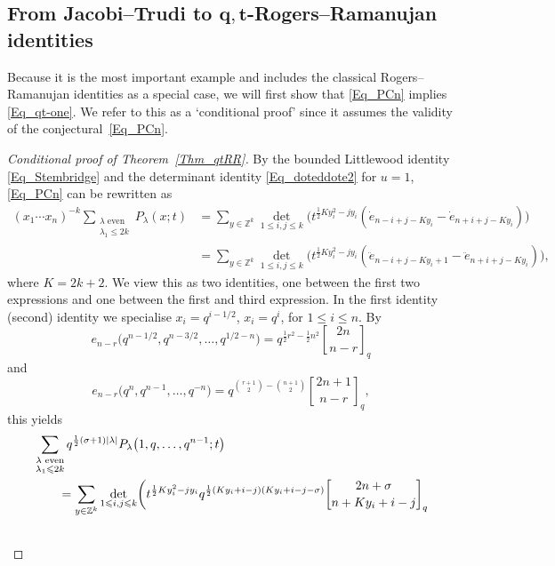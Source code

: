 \documentclass[pdftex]{sigma}
\numberwithin{equation}{section}
\renewcommand{\leq}{\leqslant}
\newcommand{\qbin}[2]{\genfrac{[}{]}{0pt}{}{#1}{#2}}
\newcommand{\abs}[1]{\vert#1\vert}
\newcommand{\la}{\lambda}
\begin{document}

\subsection[From Jacobi--Trudi to q,t-Rogers--Ramanujan identities]{From Jacobi--Trudi to $\boldsymbol{q,t}$-Rogers--Ramanujan identities}

Because it is the most important example and includes the classical
Rogers--Ramanujan identities as a special case, we will first show that
\eqref{Eq_PCn} implies \eqref{Eq_qt-one}.
We refer to this as a `conditional proof' since it assumes the validity
of the conjectural~\eqref{Eq_PCn}.

\begin{proof}[{Conditional proof of Theorem~\ref{Thm_qtRR}}]
By the bounded Littlewood identity \eqref{Eq_Stembridge} and the
determinant identity \eqref{Eq_doteddote2} for $u=1$, \eqref{Eq_PCn}
can be rewritten as
\begin{align*}
(x_1\cdots x_n)^{-k}
\sum_{\substack{\la\text{ even} \\[1pt] \la_1\leq 2k}}
P_{\la}(x;t)&=\sum_{y\in\mathbb{Z}^k}
\det_{1\leq i,j\leq k}\bigl(t^{\frac{1}{2}Ky_i^2-j y_i}
 (\dot{e}_{n-i+j-Ky_i}-\dot{e}_{n+i+j-Ky_i} )\bigr) \\
&=\sum_{y\in\mathbb{Z}^k}
\det_{1\leq i,j\leq k}\bigl(t^{\frac{1}{2}Ky_i^2-j y_i}
 (\ddot{e}_{n-i+j-Ky_i+1}-\ddot{e}_{n+i+j-Ky_i} )\bigr),
\end{align*}
where $K=2k+2$.
We view this as two identities, one between the first two
expressions and one between the first and third expression.
In the first identity (second) identity we specialise
$x_i=q^{i-1/2}$, $x_i=q^i$, for $1\leq i\leq n$.
By \cite[p.~27]{Macdonald95}
\[
e_{n-r}\bigl(q^{n-1/2},q^{n-3/2},\dots,q^{1/2-n}\bigr)
=q^{\frac{1}{2}r^2-\frac{1}{2}n^2}\qbin{2n}{n-r}_q
\]
and
\[
e_{n-r}\bigl(q^n,q^{n-1},\dots,q^{-n}\bigr)
=q^{\binom{r+1}{2}-\binom{n+1}{2}}\qbin{2n+1}{n-r}_q,
\]
this yields
\begin{align}
&\sum_{\substack{\la\text{ even} \\[1pt] \la_1\leq 2k}}
q^{\frac{1}{2}(\sigma+1)\abs{\la}}
P_{\la}\bigl(1,q,\dots,q^{n-1};t\bigr) \notag \\
&\qquad{}=\sum_{y\in\mathbb{Z}^k}
\det_{1\leq i,j\leq k}\biggl(
t^{\frac{1}{2}Ky_i^2-j y_i}q^{\frac{1}{2}(Ky_i+i-j)(Ky_i+i-j-\sigma)}
\qbin{2n+\sigma}{n+Ky_i+i-j}_q \notag \\
&\hphantom{\qquad{}=\sum_{y\in\mathbb{Z}^k}
}
\end{align}
\end{proof}
\end{document}
